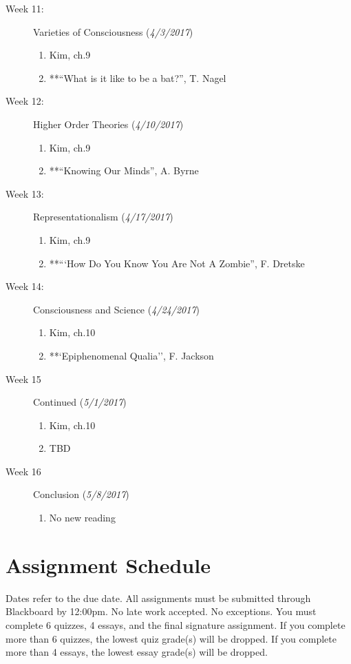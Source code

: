 \documentclass[article,oneside]{memoir}
\begin{document}
\begin{description}
\item[Week 11:] Varieties of Consciousness (\emph{4/3/2017})
\begin{enumerate}
\item Kim, ch.9
\item **``What is it like to be a bat?'', T. Nagel
\end{enumerate}

\item[Week 12:] Higher Order Theories (\emph{4/10/2017})
\begin{enumerate}
\item Kim, ch.9
\item**``Knowing Our Minds'', A. Byrne
\end{enumerate}


\item[Week 13:] Representationalism  (\emph{4/17/2017})
\begin{enumerate}
\item Kim, ch.9
\item **``‘How Do You Know You Are Not A Zombie'', F. Dretske 
\end{enumerate}

\item[Week 14:] Consciousness and Science (\emph{4/24/2017})
\begin{enumerate}
\item Kim, ch.10
\item**`Epiphenomenal Qualia'', F. Jackson 
\end{enumerate}


\item[Week 15]  Continued  (\emph{5/1/2017})
\begin{enumerate}
\item  Kim, ch.10
\item TBD
\end{enumerate}

\item[Week 16]  Conclusion (\emph{5/8/2017})
\begin{enumerate}
\item No new reading
\end{enumerate}



\end{description}





\section{ Assignment Schedule}
Dates refer to the due date. All assignments must be submitted through Blackboard by 12:00pm. No late work accepted. No exceptions. You must complete 6 quizzes, 4 essays, and the final signature assignment.  If you complete more than 6 quizzes, the lowest quiz grade(s) will be dropped. If you complete more than 4 essays, the lowest essay grade(s) will be dropped. 
\end{document}
